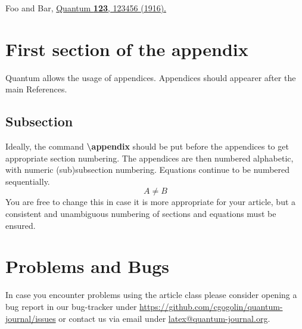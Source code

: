 \documentclass[prx,a4paper,aps,twocolumn,superscriptaddress,11pt]{quantumarticle}
\begin{document}

\begin{thebibliography}{9}
  Foo and Bar, 
  \href{https://doi.org/10.22331/
        idonotexist}{Quantum 
        \textbf{123}, 123456 (1916).}
\end{thebibliography}

\appendix

\section{First section of the appendix}
Quantum allows the usage of appendices.
Appendices should appearer after the main References.

\subsection{Subsection}
Ideally, the command \textbf{\textbackslash{}appendix} should be put before the appendices to get appropriate section numbering.
The appendices are then numbered alphabetic, with numeric (sub)subsection numbering.
Equations continue to be numbered sequentially. 
\begin{equation}
  A \neq B
\end{equation}
You are free to change this in case it is more appropriate for your article, but a consistent and unambiguous numbering of sections and equations must be ensured.

\section{Problems and Bugs}
In case you encounter problems using the article class please consider opening a bug report in our bug-tracker under \href{https://github.com/cgogolin/quantum-journal/issues}{https://github.com/cgogolin/quantum-journal/issues} or contact us via email under \href{mailto:latex@quantum-journal.org}{latex@quantum-journal.org}. 
\end{document}
